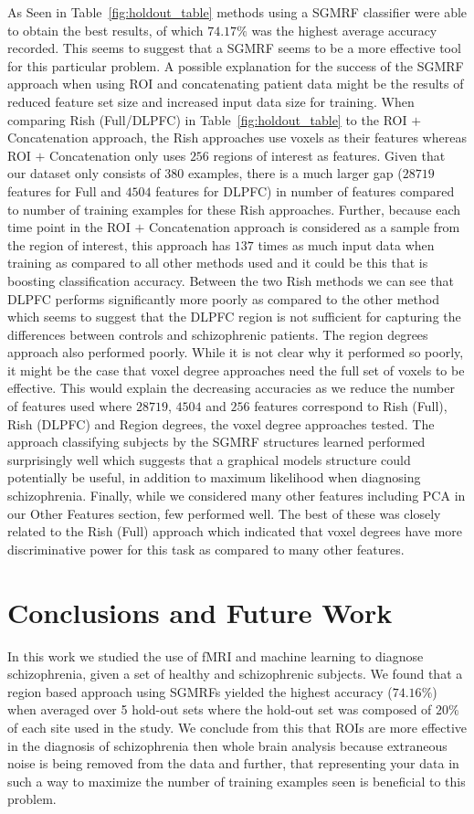 \documentclass{article} %
\begin{document}
As Seen in Table~\ref{fig:holdout_table} methods using a SGMRF classifier were
able to obtain the best results, of which $74.17\%$ was the highest average
accuracy recorded. This seems to suggest that a SGMRF seems to be a more
effective tool for this particular problem. A possible explanation for the
success of the SGMRF approach when using ROI and concatenating patient
data might be the results of reduced feature set size and increased input data
size for training. When comparing Rish (Full/DLPFC) in Table~\ref{fig:holdout_table} 
to the ROI $+$ Concatenation approach, the Rish approaches use voxels as their
features whereas ROI $+$ Concatenation only uses $256$ regions of interest as 
features. Given that our dataset only consists of $380$ examples, there is a 
much larger gap ($28719$ features for Full and $4504$ features for DLPFC) in 
number of features compared to number of training examples for these Rish 
approaches. Further, because each time point in the ROI $+$ Concatenation 
approach is considered as a sample from the region of interest, this approach
has $137$ times as much input data when training as compared to all other
methods used and it could be this that is boosting classification accuracy.
Between the two Rish methods we can see that DLPFC performs significantly
more poorly as compared to the other method which seems to suggest that the
DLPFC region is not sufficient for capturing the differences between controls
and schizophrenic patients. The region degrees approach also performed poorly.
While it is not clear why it performed so poorly, it might be the case that
voxel degree approaches need the full set of voxels to be effective. This would
explain the decreasing accuracies as we reduce the number of features used where
$28719$, $4504$ and $256$ features correspond to Rish (Full), Rish (DLPFC) and 
Region degrees, the voxel degree approaches tested. The approach classifying
subjects by the SGMRF structures learned performed surprisingly well which
suggests that a graphical models structure could potentially be useful, in 
addition to maximum likelihood when diagnosing schizophrenia. Finally, while
we considered many other features including PCA in our Other Features section, few performed
well. The best of these was closely related to the Rish (Full) approach which
indicated that voxel degrees have more discriminative power for this task as
compared to many other features.


\section{Conclusions and Future Work}
In this work we studied the use of fMRI and machine learning to diagnose
schizophrenia, given a set of healthy and schizophrenic subjects. We found
that a region based approach using SGMRFs yielded the highest accuracy 
($74.16\%$) when averaged over 5 hold-out sets where the hold-out set was
composed of $20\%$ of each site used in the study. We conclude from this
that ROIs are more effective in the diagnosis of schizophrenia then whole
brain analysis because extraneous noise is being removed from the data and
further, that representing your data in such a way to maximize the number
of training examples seen is beneficial to this problem.
\end{document}
